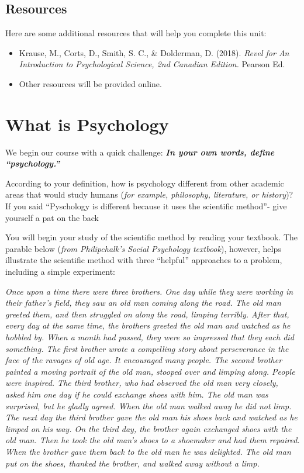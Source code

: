 \documentclass[
]{book}
\providecommand{\tightlist}{%
  \setlength{\itemsep}{0pt}\setlength{\parskip}{0pt}}
\begin{document}
\hypertarget{resources}{%
\subsection*{Resources}\label{resources}}

Here are some additional resources that will help you complete this unit:

\begin{itemize}
\tightlist
\item
  Krause, M., Corts, D., Smith, S. C., \& Dolderman, D. (2018). \emph{Revel for An Introduction to Psychological Science, 2nd Canadian Edition.} Pearson Ed.\\
\item
  Other resources will be provided online.
\end{itemize}

\hypertarget{what-is-psychology}{%
\section{What is Psychology}\label{what-is-psychology}}

We begin our course with a quick challenge: \textbf{\emph{In your own words, define ``psychology.''}}

According to your definition, how is psychology different from other academic areas that would study humans (\emph{for example, philosophy, literature, or history})? If you said ``Pyschology is different because it uses the scientific method''- give yourself a pat on the back

You will begin your study of the scientific method by reading your textbook. The parable below (\emph{from Philipchalk's Social Psychology textbook}), however, helps illustrate the scientific method with three ``helpful'' approaches to a problem, including a simple experiment:

\emph{Once upon a time there were three brothers. One day while they were working in their father's field, they saw an old man coming along the road. The old man greeted them, and then struggled on along the road, limping terribly. After that, every day at the same time, the brothers greeted the old man and watched as he hobbled by. When a month had passed, they were so impressed that they each did something. The first brother wrote a compelling story about perseverance in the face of the ravages of old age. It encouraged many people. The second brother painted a moving portrait of the old man, stooped over and limping along. People were inspired. The third brother, who had observed the old man very closely, asked him one day if he could exchange shoes with him. The old man was surprised, but he gladly agreed. When the old man walked away he did not limp. The next day the third brother gave the old man his shoes back and watched as he limped on his way. On the third day, the brother again exchanged shoes with the old man. Then he took the old man's shoes to a shoemaker and had them repaired. When the brother gave them back to the old man he was delighted. The old man put on the shoes, thanked the brother, and walked away without a limp.}
\end{document}
